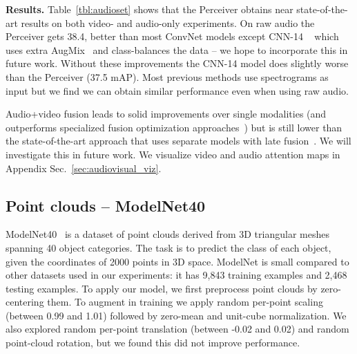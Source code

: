 \documentclass{article}
\begin{document}
\noindent \textbf{Results.} Table~\ref{tbl:audioset} shows that the Perceiver obtains near state-of-the-art results on both video- and audio-only experiments. On raw audio the Perceiver gets 38.4, better than most ConvNet models except CNN-14 ~\cite{kong2020panns}  which uses extra   AugMix~\cite{hendrycks2019augmix} and class-balances the data -- we hope to incorporate this in future work. Without these improvements the CNN-14 model does slightly worse than the Perceiver (37.5 mAP). Most previous methods use spectrograms as input but we find we can obtain similar performance even when using raw audio.

Audio+video fusion leads to solid improvements over single modalities (and outperforms specialized fusion optimization approaches~\cite{wang2020makes}) but is still lower than the state-of-the-art approach that uses separate models with late fusion~\cite{fayek2020large}. We will investigate this in future work. We visualize video and audio attention maps in Appendix Sec.~\ref{sec:audiovisual_viz}.

\subsection{Point clouds -- ModelNet40}

ModelNet40~\cite{wu20153d} is a dataset of point clouds derived from 3D triangular meshes spanning 40 object categories. The task is to predict the class of each object, given the coordinates of  2000 points in 3D space. ModelNet is small compared to other datasets used in our experiments: it has 9,843 training examples and 2,468 testing examples. To apply our model, we first preprocess point clouds by zero-centering them. To augment in training we apply random per-point scaling (between 0.99 and 1.01) followed by zero-mean and unit-cube normalization. We also explored random per-point translation (between -0.02 and 0.02) and random point-cloud rotation, but we found this did not improve performance.
\end{document}
